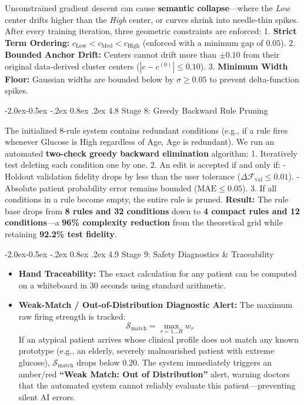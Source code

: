 \documentclass[10pt,a4paper]{article}
\makeatletter
\renewcommand\subsubsection{\@startsection{subsubsection}{3}{\z@}%
                                     {-2.0ex\@plus -0.5ex \@minus -.2ex}%
                                     {0.8ex \@plus .2ex}%
                                     {\normalfont\normalsize\bfseries\color{accent}}}
\providecommand{\tightlist}{\setlength{\itemsep}{1pt}\setlength{\parskip}{1pt}}
\makeatother
\begin{document}
Unconstrained gradient descent can cause \textbf{semantic
collapse}---where the \emph{Low} center drifts higher than the
\emph{High} center, or curves shrink into needle-thin spikes. After
every training iteration, three geometric constraints are enforced: 1.
\textbf{Strict Term Ordering:}
\(c_{\text{Low}} < c_{\text{Med}} < c_{\text{High}}\) (enforced with a
minimum gap of \(0.05\)). 2. \textbf{Bounded Anchor Drift:} Centers
cannot drift more than \(\pm 0.10\) from their original data-derived
cluster centers (\(|c - c^{(0)}| \le 0.10\)). 3. \textbf{Minimum Width
Floor:} Gaussian widths are bounded below by \(\sigma \ge 0.05\) to
prevent delta-function spikes.

\subsubsection{4.8 Stage 8: Greedy Backward Rule
Pruning}\label{stage-8-greedy-backward-rule-pruning}

The initialized 8-rule system contains redundant conditions (e.g., if a
rule fires whenever Glucose is High regardless of Age, Age is
redundant). We run an automated \textbf{two-check greedy backward
elimination} algorithm: 1. Iteratively test deleting each condition one
by one. 2. An edit is accepted if and only if: - Holdout validation
fidelity drops by less than the user tolerance
(\(\Delta \mathcal{F}_{\text{val}} \le 0.01\)). - Absolute patient
probability error remains bounded (\(\text{MAE} \le 0.05\)). 3. If all
conditions in a rule become empty, the entire rule is pruned.
\textbf{Result:} The rule base drops from \textbf{8 rules and 32
conditions} down to \textbf{4 compact rules and 12 conditions}---a
\textbf{96\% complexity reduction} from the theoretical grid while
retaining \textbf{92.2\% test fidelity}.

\subsubsection{4.9 Stage 9: Safety Diagnostics \&
Traceability}\label{stage-9-safety-diagnostics-traceability}

\begin{itemize}
\tightlist
\item
  \textbf{Hand Traceability:} The exact calculation for any patient can
  be computed on a whiteboard in 30 seconds using standard arithmetic.
\item
  \textbf{Weak-Match / Out-of-Distribution Diagnostic Alert:} The
  maximum raw firing strength is tracked:
  \[\mathcal{S}_{\text{match}} = \max_{r=1 \dots R} w_r\] If an atypical
  patient arrives whose clinical profile does not match any known
  prototype (e.g., an elderly, severely malnourished patient with
  extreme glucose), \(\mathcal{S}_{\text{match}}\) drops below \(0.20\).
  The system immediately triggers an amber/red \textbf{``Weak Match: Out
  of Distribution''} alert, warning doctors that the automated system
  cannot reliably evaluate this patient---preventing silent AI errors.
\end{itemize}
\end{document}
